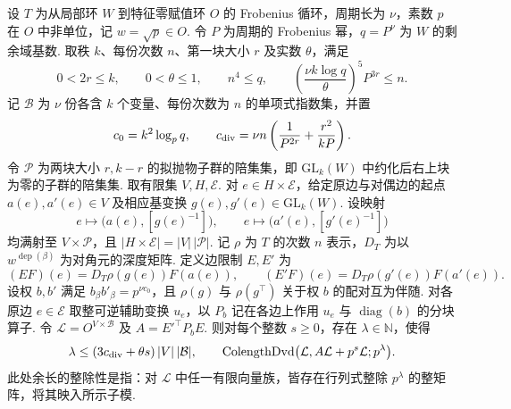 \begin{lemma}[边限制的配对与余长]
\label{lem:a-edge-pairing-colength}
\emitthmsource
设 $T$ 为从局部环 $W$ 到特征零赋值环 $O$ 的 Frobenius 循环，周期长为 $\nu$，素数 $p$ 在 $O$ 中非单位，记 $w=\sqrt p\in O$. 令 $P$ 为周期的 Frobenius 幂，$q=P^\nu$ 为 $W$ 的剩余域基数. 取秩 $k$、每份次数 $n$、第一块大小 $r$ 及实数 $\theta$，满足
\[
 0<2r\le k,\qquad 0<\theta\le1,\qquad n^4\le q,
 \qquad \left(\frac{\nu k\log q}{\theta}\right)^5 P^{3r}\le n .
\]
记 $\mathcal B$ 为 $\nu$ 份各含 $k$ 个变量、每份次数为 $n$ 的单项式指数集，并置
\[
  c_0=k^2\log_p q,\qquad
  c_{\rm div}=\nu n\left(\frac1{P^{2r}}+\frac{r^2}{kP}\right).
\]
令 $\mathcal P$ 为两块大小 $r,k-r$ 的拟抛物子群的陪集集，即 $\mathrm{GL}_k(W)$ 中约化后右上块为零的子群的陪集集. 取有限集 $V,H,\mathcal E$. 对 $e\in H\times\mathcal E$，给定原边与对偶边的起点 $a(e),a'(e)\in V$ 及相应基变换 $g(e),g'(e)\in\mathrm{GL}_k(W)$. 设映射
\[
 e\longmapsto\bigl(a(e),[g(e)^{-1}]\bigr),\qquad
 e\longmapsto\bigl(a'(e),[g'(e)^{-1}]\bigr)
\]
均满射至 $V\times\mathcal P$，且 $|H\times\mathcal E|=|V|\,|\mathcal P|$. 记 $\rho$ 为 $T$ 的次数 $n$ 表示，$D_T$ 为以 $w^{\operatorname{dep}(\beta)}$ 为对角元的深度矩阵. 定义边限制 $E,E'$ 为
\[
 (EF)(e)=D_T\rho(g(e))F(a(e)),\qquad
 (E'F)(e)=D_T\rho(g'(e))F(a'(e)).
\]
设权 $b,b'$ 满足 $b_\beta b'_\beta=p^{\nu c_0}$，且 $\rho(g)$ 与 $\rho(g^\top)$ 关于权 $b$ 的配对互为伴随. 对各原边 $e\in\mathcal E$ 取整可逆辅助变换 $u_e$，以 $P_b$ 记在各边上作用 $u_e$ 与 $\operatorname{diag}(b)$ 的分块算子. 令 $\mathcal L=O^{V\times\mathcal B}$ 及 $A=E'^\top P_bE$. 则对每个整数 $s\ge0$，存在 $\lambda\in\mathbb N$，使得
\[
 \lambda\le(3c_{\rm div}+\theta s)\,|V|\,|\mathcal B|,
 \qquad
 \operatorname{ColengthDvd}\bigl(\mathcal L,A\mathcal L+p^s\mathcal L;p^\lambda\bigr).
\]
此处余长的整除性是指：对 $\mathcal L$ 中任一有限向量族，皆存在行列式整除 $p^\lambda$ 的整矩阵，将其映入所示子模.
\end{lemma}
